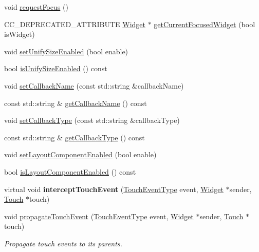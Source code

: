 \begin{DoxyCompactItemize}
\item 
void \hyperlink{classui_1_1Widget_a3f37229935bf05eeb4e08fe70250c52b}{request\+Focus} ()
\item 
C\+C\+\_\+\+D\+E\+P\+R\+E\+C\+A\+T\+E\+D\+\_\+\+A\+T\+T\+R\+I\+B\+U\+TE \hyperlink{classui_1_1Widget}{Widget} $\ast$ \hyperlink{classui_1_1Widget_aa99022fd0622fc02512aabc82ff4bce6}{get\+Current\+Focused\+Widget} (bool is\+Widget)
\item 
void \hyperlink{classui_1_1Widget_a95c1265f951f97e9d7088f26ba745ff4}{set\+Unify\+Size\+Enabled} (bool enable)
\item 
bool \hyperlink{classui_1_1Widget_ad4e0c8796f018f4a1a97e9ca860d6f43}{is\+Unify\+Size\+Enabled} () const
\item 
void \hyperlink{classui_1_1Widget_a9055626a00d49c171b008fc8424f3774}{set\+Callback\+Name} (const std\+::string \&callback\+Name)
\item 
const std\+::string \& \hyperlink{classui_1_1Widget_a203e45394e7671583ef71c5a9308762e}{get\+Callback\+Name} () const
\item 
void \hyperlink{classui_1_1Widget_a98c80020539ad23efcad93fd5e42749d}{set\+Callback\+Type} (const std\+::string \&callback\+Type)
\item 
const std\+::string \& \hyperlink{classui_1_1Widget_a594b66f5c19a8395b7b67ab7b8aa70b4}{get\+Callback\+Type} () const
\item 
void \hyperlink{classui_1_1Widget_a28a78caf974c170fce6ef1742d517fae}{set\+Layout\+Component\+Enabled} (bool enable)
\item 
bool \hyperlink{classui_1_1Widget_ab7dd215ebc30a43a24f441063bbc3fea}{is\+Layout\+Component\+Enabled} () const
\item 
\mbox{\label{classui_1_1Widget_a428c2aa661da33fb9d7bfc1659b164c0}} 
virtual void {\bfseries intercept\+Touch\+Event} (\hyperlink{classui_1_1Widget_a4829c0f1cbaf1fd820a9b2ccf0c58c73}{Touch\+Event\+Type} event, \hyperlink{classui_1_1Widget}{Widget} $\ast$sender, \hyperlink{classTouch}{Touch} $\ast$touch)
\item 
\mbox{\label{classui_1_1Widget_abd3ef28c29bd9526e2d1373c85542c32}} 
void \hyperlink{classui_1_1Widget_abd3ef28c29bd9526e2d1373c85542c32}{propagate\+Touch\+Event} (\hyperlink{classui_1_1Widget_a4829c0f1cbaf1fd820a9b2ccf0c58c73}{Touch\+Event\+Type} event, \hyperlink{classui_1_1Widget}{Widget} $\ast$sender, \hyperlink{classTouch}{Touch} $\ast$touch)
\begin{DoxyCompactList}\small\item\em Propagate touch events to its parents. \end{DoxyCompactList}\item 

\end{DoxyCompactItemize}
